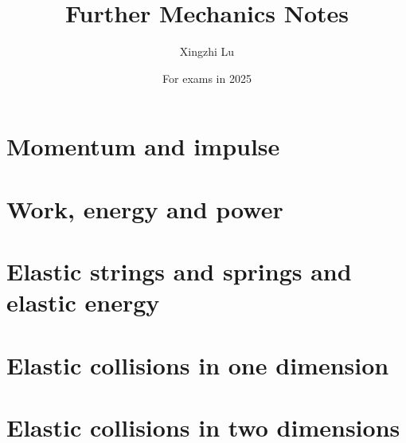 \documentclass[oneside, fleqn, 11pt]{book}
\title{Further Mechanics Notes}
\author{Xingzhi Lu}
\date{For exams in 2025}
\begin{document}
	\maketitle
    \everymath{\displaystyle}
	
	\chapter{Momentum and impulse}
    
	
    \chapter{Work, energy and power}
    

	
	\chapter{Elastic strings and springs and elastic energy}
	
	
	
	\chapter{Elastic collisions in one dimension}
    
	
	\chapter{Elastic collisions in two dimensions}
	
	
	
	
	
	
\end{document}
